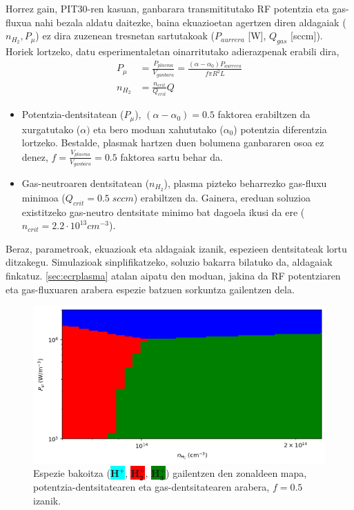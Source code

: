 \documentclass[12pt]{article}
\numberwithin{figure}{section}
\numberwithin{equation}{section}
\begin{document}
Horrez gain, PIT30-ren kasuan, ganbarara transmititutako RF potentzia eta gas-fluxua nahi bezala aldatu daitezke, baina ekuazioetan agertzen diren aldagaiak ($n_{H_2},P_\mu$) ez dira zuzenean tresnetan sartutakoak ($P_{aurrera}$ [W], $Q_{gas}$ [sccm]). Horiek lortzeko, datu esperimentaletan oinarritutako adierazpenak erabili dira,
\begin{align}
    P_\mu &= \frac{P_{plasma}}{V_{ganbara}} = \frac{(\alpha - \alpha_0)P_{aurrera}}{f\pi R^2L} \label{eq:potdentsitate} \\
    n_{H_2} &= \frac{n_{crit}}{Q_{crit}}Q \label{eq:gasfluxu}
\end{align}
\begin{itemize}
    \item Potentzia-dentsitatean ($P_{\mu}$), $(\alpha - \alpha_0)=\num{0.5}$ faktorea erabiltzen da xurgatutako ($\alpha)$ eta bero moduan xahututako ($\alpha_0$) potentzia diferentzia lortzeko. Bestalde, plasmak hartzen duen bolumena ganbararen osoa ez denez, $f=\frac{V_{plasma}}{V_{ganbara}}=\num{0.5}$ faktorea sartu behar da. 
    \item Gas-neutroaren dentsitatean ($n_{H_2}$), plasma pizteko beharrezko gas-fluxu minimoa ($Q_{crit}=\num{0.5}\;sccm$) erabiltzen da. Gainera, ereduan soluzioa existitzeko gas-neutro dentsitate minimo bat dagoela ikusi da ere ($n_{crit}=\num{2.2}\cdot 10^{13}cm^{-3}$).
\end{itemize}

Beraz, parametroak, ekuazioak eta aldagaiak izanik, espezieen dentsitateak lortu ditzakegu. Simulazioak sinplifikatzeko, soluzio bakarra bilatuko da, aldagaiak finkatuz. \ref{sec:ecrplasma} atalan aipatu den moduan, jakina da RF potentziaren eta gas\hyp{}fluxuaren arabera espezie batzuen sorkuntza gailentzen dela.

\begin{figure}[h]
    \centering
    \includegraphics[width=0.7\linewidth]{2 - Oinarri teorikoa/predominant_volume.png}
    \caption{Espezie bakoitza (\colorbox{cyan}{$\mathbf{H_{ }^+}$}, \colorbox{red}{$\mathbf{H_2^+}$}, \colorbox{green}{$\mathbf{H_3^+}$}) gailentzen den zonaldeen mapa, potentzia-dentsitatearen eta gas-dentsitatearen arabera, $f=\num{0.5}$ izanik.}
    \label{fig:predominant}
\end{figure}
\end{document}

